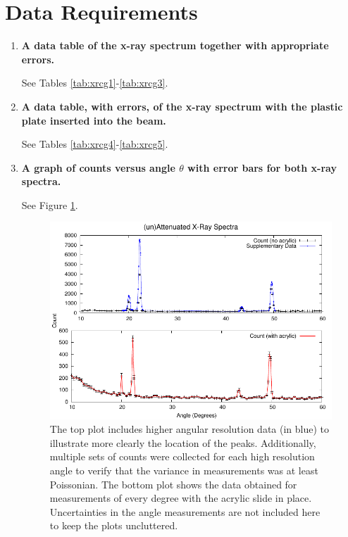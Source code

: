 \documentclass[justified]{tufte-book}
\begin{document}
\section{Data Requirements}
\begin{enumerate}

\item {\bf A data table of the x-ray spectrum together with appropriate errors.}\newline

See Tables \ref{tab:xrcg1}-\ref{tab:xrcg3}.

\item {\bf A data table, with errors, of the x-ray spectrum with the plastic plate inserted into the beam.}\newline

See Tables \ref{tab:xrcg4}-\ref{tab:xrcg5}.

\item {\bf A graph of counts versus angle $\theta$ with error bars for both x-ray spectra.}\newline

See Figure \ref{fig:xrcg1}.

\begin{figure}
\includegraphics{XRaySpec-Angle.pdf}
\caption{The top plot includes higher angular resolution data (in blue) to illustrate more clearly the location of the peaks. Additionally, multiple sets of counts were collected for each high resolution angle to verify that the variance in measurements was at least Poissonian. The bottom plot shows the data obtained for measurements of every degree with the acrylic slide in place. Uncertainties in the angle measurements are not included here to keep the plots uncluttered.}
\label{fig:xrcg1}
\end{figure}


\end{enumerate}
\end{document}

